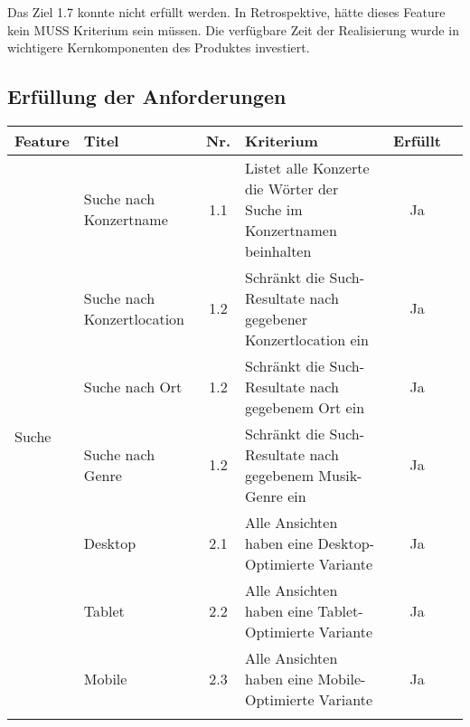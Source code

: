 Das Ziel 1.7 konnte nicht erfüllt werden. In Retrospektive, hätte dieses
Feature kein MUSS Kriterium sein müssen. Die verfügbare Zeit der Realisierung
wurde in wichtigere Kernkomponenten des Produktes investiert.

\clearpage
\subsection{Erfüllung der Anforderungen}

\begin{longtable}[]{@{}p{1.9cm}p{2.5cm}cp{5.5cm}cc@{}}
  \toprule
  \textbf{Feature}           & \textbf{Titel}             & \textbf{Nr.} & \textbf{Kriterium}                                                                                          & \textbf{Erfüllt}\tabularnewline
  \midrule
  \endhead
  \multirow{10}{*}{Suche}    & Suche nach Konzertname     & 1.1          & Listet alle Konzerte die Wörter der Suche im Konzertnamen beinhalten                                        & Ja                              \\ \cline{2-6}
                             & Suche nach Konzertlocation & 1.2          & Schränkt die Such-Resultate nach gegebener Konzertlocation ein                                              & Ja                              \\ \cline{2-6}
                             & Suche nach Ort             & 1.2          & Schränkt die Such-Resultate nach gegebenem Ort ein                                                          & Ja                              \\ \cline{2-6}
                             & Suche nach Genre           & 1.2          & Schränkt die Such-Resultate nach gegebenem Musik-Genre ein                                                  & Ja                              \\
  \midrule
  \multirow{8}{*}{Design}    & Desktop                    & 2.1          & Alle Ansichten haben eine Desktop-Optimierte Variante                                                       & Ja                              \\ \cline{2-6}
                             & Tablet                     & 2.2          & Alle Ansichten haben eine Tablet-Optimierte Variante                                                        & Ja                              \\ \cline{2-6}
                             & Mobile                     & 2.3          & Alle Ansichten haben eine Mobile-Optimierte Variante                                                        & Ja                              \\ \cline{2-6}

\end{longtable}
